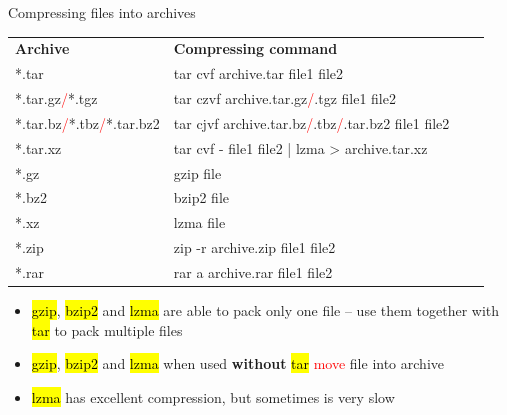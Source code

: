 \documentclass[compress, ucs, xelatex, 11pt, xcolor=svgnames,
  hyperref={
    bookmarks=true,
    unicode=true,
    colorlinks=true,
    pdftitle={Linux, command line and MetaCentrum},
    plainpages=false,
    pdfauthor={Vojtech Zeisek},
    pdfsubject={Course about use of Linux command line, writing shell scripts and using MetaCentrum of CESNET},
    pdfcreator={XeLaTeX},
    pdfkeywords={Linux, GNU, BASH, shell, command line, MetaCentrum},
    linkcolor=Red,
    anchorcolor=Blue,
    citecolor=Purple,
    filecolor=DodgerBlue,
    menucolor=DarkOrchid,
    urlcolor=DeepSkyBlue,
    pdftex},
  url={hyphens, lowtilde} %
  ]{beamer}
\renewcommand{\texttt}[1]{\hl{\ttfamily #1}}
\renewcommand{\alert}[1]{\textcolor{red}{#1}}
\begin{document}
\begin{frame}{Compressing files into archives}
\begin{center}
\begin{tabular}{llll}
\textbf{Archive} & \textbf{Compressing command}\\
*.tar & tar cvf archive.tar file1 file2\\
*.tar.gz\alert{/}*.tgz & tar czvf archive.tar.gz\alert{/}.tgz file1 file2\\
*.tar.bz\alert{/}*.tbz\alert{/}*.tar.bz2 & tar cjvf archive.tar.bz\alert{/}.tbz\alert{/}.tar.bz2 file1 file2\\
*.tar.xz & tar cvf - file1 file2 | lzma > archive.tar.xz\\
*.gz & gzip file\\
*.bz2 & bzip2 file\\
*.xz & lzma file\\
*.zip & zip -r archive.zip file1 file2\\
*.rar & rar a archive.rar file1 file2\\
\end{tabular}
\end{center}
\begin{itemize}
  \item \texttt{gzip}, \texttt{bzip2} and \texttt{lzma} are able to pack only one file -- use them together with \texttt{tar} to pack multiple files
  \item \texttt{gzip}, \texttt{bzip2} and \texttt{lzma} when used \textbf{without} \texttt{tar} \alert{move} file into archive
  \item \texttt{lzma} has excellent compression, but sometimes is very slow
\end{itemize}
\end{frame}
\end{document}
